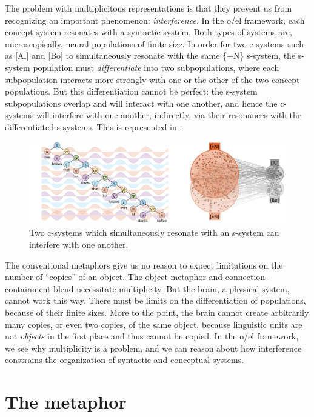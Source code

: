   The problem with multiplicitous representations is that they prevent us from recognizing an important phenomenon: \textit{interference}. In the o/el framework, each concept system resonates with a syntactic system. Both types of systems are, microscopically, neural populations of finite size. In order for two c-systems such as [Al] and [Bo] to simultaneously resonate with the same \{+N\} s-system, the s-system population must \textit{differentiate} into two subpopulations, where each subpopulation interacts more strongly with one or the other of the two concept populations. But this differentiation cannot be perfect: the s-system subpopulations overlap and will interact with one another, and hence the c-systems will interfere with one another, indirectly, via their resonances with the differentiated s-systems. This is represented in {}.

  
\begin{figure}
\includegraphics[width=\textwidth]{figures/Tilsen-img37.png}
\caption{Two c-systems which simultaneously resonate with an s-system can interfere with one another.}
\label{fig:3:9}
\end{figure}
 

  The conventional metaphors give us no reason to expect limitations on the number of “copies” of an object. The object metaphor and connection-containment blend necessitate multiplicity. But the brain, a physical system, cannot work this way. There must be limits on the differentiation of populations, because of their finite sizes. More to the point, the brain cannot create arbitrarily many copies, or even two copies, of the same object, because linguistic units are not \textit{objects} in the first place and thus cannot be copied. In the o/el framework, we see why multiplicity is a problem, and we can reason about how interference constrains the organization of syntactic and conceptual systems. 
  
\section{The {} metaphor}

